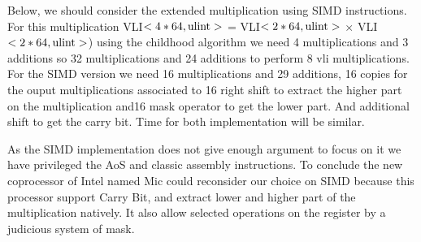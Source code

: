 \documentclass[11pt]{amsart}
\begin{document}
Below, we should consider the extended  multiplication using SIMD instructions. For this multiplication   VLI$<4*64, \texttt{\textrm{ulint}}>$  = VLI$<2*64, \texttt{\textrm{ulint}}>$ $\times$ VLI$<2*64, \texttt{\textrm{ulint}}>$) using the
childhood  algorithm we need 4 multiplications and 3 additions so 32 multiplications and 24 additions to perform 8 vli multiplications. For the SIMD version we need 16 multiplications and 29 additions, 16 copies for the ouput multiplications 
associated to 16 right shift  to extract the higher part on the multiplication and16 mask operator to get the lower part. And additional shift to get the carry bit. Time for both implementation will be similar. 

As the SIMD implementation does not give enough argument to focus on it we have privileged  the AoS and classic assembly instructions. To conclude the new coprocessor of Intel named Mic could reconsider our choice on SIMD
because this processor support Carry Bit, and extract lower and higher part of the multiplication natively. It also allow selected operations on the register by a judicious system of mask.
\end{document}
